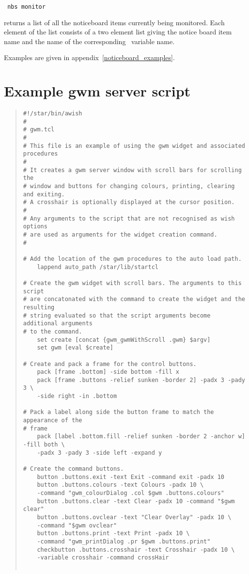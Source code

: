 \begin{tquote}{\tt
nbs monitor
}\end{tquote}
returns a list of all the noticeboard items currently being monitored. 
Each element of the list consists of a two element list giving the 
notice board item name and the name of the corresponding \Tcl\ variable name.

Examples are given in appendix~\ref{noticeboard_examples}.

\newpage
\appendix
\section{\label{example_gwm_server_script}Example gwm server script}

\begin{small}
\begin{quote}
\begin{verbatim}
#!/star/bin/awish
#
# gwm.tcl
#
# This file is an example of using the gwm widget and associated procedures
#
# It creates a gwm server window with scroll bars for scrolling the
# window and buttons for changing colours, printing, clearing and exiting.
# A crosshair is optionally displayed at the cursor position.
#
# Any arguments to the script that are not recognised as wish options
# are used as arguments for the widget creation command.
#

# Add the location of the gwm procedures to the auto load path.
    lappend auto_path /star/lib/startcl

# Create the gwm widget with scroll bars. The arguments to this script
# are concatonated with the command to create the widget and the resulting
# string evaluated so that the script arguments become additional arguments
# to the command.
    set create [concat {gwm_gwmWithScroll .gwm} $argv]
    set gwm [eval $create]

# Create and pack a frame for the control buttons.
    pack [frame .bottom] -side bottom -fill x
    pack [frame .buttons -relief sunken -border 2] -padx 3 -pady 3 \
	-side right -in .bottom

# Pack a label along side the button frame to match the appearance of the
# frame
    pack [label .bottom.fill -relief sunken -border 2 -anchor w] -fill both \
	-padx 3 -pady 3 -side left -expand y

# Create the command buttons.
    button .buttons.exit -text Exit -command exit -padx 10
    button .buttons.colours -text Colours -padx 10 \
	-command "gwm_colourDialog .col $gwm .buttons.colours"
    button .buttons.clear -text Clear -padx 10 -command "$gwm clear"
    button .buttons.ovclear -text "Clear Overlay" -padx 10 \
	-command "$gwm ovclear"
    button .buttons.print -text Print -padx 10 \
	-command "gwm_printDialog .pr $gwm .buttons.print"
    checkbutton .buttons.crosshair -text Crosshair -padx 10 \
	-variable crosshair -command crossHair


\end{verbatim}
\end{quote}
\end{small}
